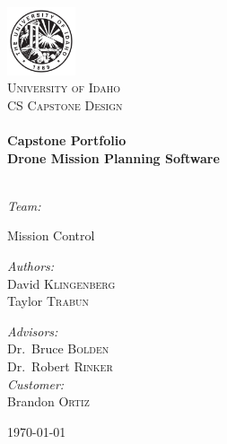 
\begin{titlepage}
\begin{center}

\includegraphics[width=0.15\textwidth]{./icons/04UI_Seal-Black.jpg}~\\[1cm]

\textsc{\LARGE University of Idaho}\\[1.5cm]

\textsc{\Large CS Capstone Design}\\[0.5cm]

\HRule \\[0.4cm]
{ \huge \bfseries Capstone Portfolio \\[0.4cm] }
{ \huge \bfseries Drone Mission Planning Software \\[0.4cm] }
\HRule \\[1.5cm]
\centerline{\emph{Team:}}
\centerline{Mission Control}
\noindent
\begin{minipage}{0.4\textwidth}
\begin{flushleft} \large
\emph{Authors:}\\
David \textsc{Klingenberg}\\
Taylor \textsc{Trabun}
\end{flushleft}
\end{minipage}%
\begin{minipage}{0.4\textwidth}
\begin{flushright} \large
\vspace{20pt}
\emph{Advisors:} \\
Dr.~Bruce \textsc{Bolden}\\
Dr.~Robert \textsc{Rinker}\\
\vspace{10pt}
\emph{Customer:}\\
Brandon \textsc{Ortiz}
\end{flushright}
\end{minipage}

\vfill

{\large \today}

\end{center}
\end{titlepage}